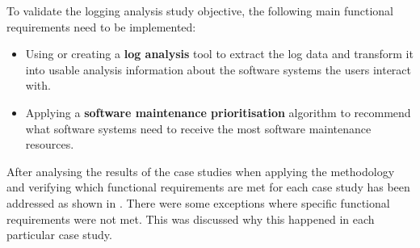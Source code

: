 \begin{enumerate}[label=\textbf{\Roman*.}]
	 To validate the logging analysis study objective, the following main functional requirements need to be implemented:
	 \begin{itemize}
		\item Using or creating a \textbf{log analysis} tool to extract the log data and transform it into usable analysis information about the software systems the users interact with.
		\item Applying a \textbf{software maintenance prioritisation} algorithm to recommend what software systems need to receive the most software maintenance resources.
	 \end{itemize}

	 After analysing the results of the case studies when applying the methodology and verifying which functional requirements are met for each case study has been addressed as shown in . There were some exceptions where specific functional requirements were not met. This was discussed why this happened in each particular case study.
\end{enumerate}

